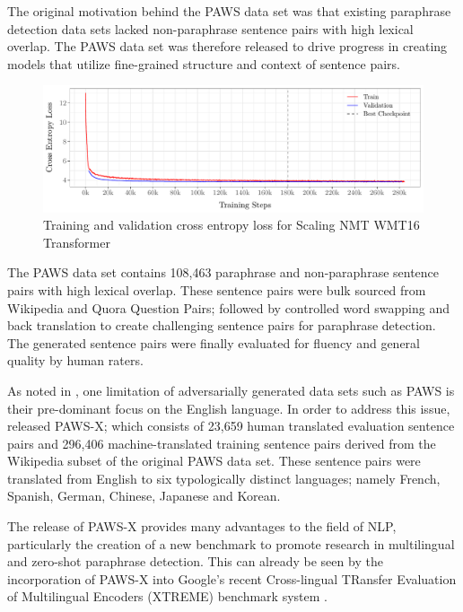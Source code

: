 \documentclass[11pt,a4paper]{article}
\begin{document}
The original motivation behind the PAWS data set was that existing paraphrase detection data sets lacked non-paraphrase sentence pairs with high lexical overlap. The PAWS data set was therefore released to drive progress in creating models that utilize fine-grained structure and context of sentence pairs.

\begin{figure}
  \centering 
  \includegraphics[trim={0cm 0cm 0cm 0cm},clip,width=\textwidth]{transformer_nmt_evolution.pdf}
  \caption{Training and validation cross entropy loss for Scaling NMT WMT16 Transformer}
  \label{transformer_nmt_evolution}
\end{figure}

The PAWS data set contains 108,463 paraphrase and non-paraphrase sentence pairs with high lexical overlap. These sentence pairs were bulk sourced from Wikipedia and Quora Question Pairs; followed by controlled word swapping and back translation to create challenging sentence pairs for paraphrase detection. The generated sentence pairs were finally evaluated for fluency and general quality by human raters.

As noted in \citet{pawsx2019emnlp}, one limitation of adversarially generated data sets such as PAWS is their pre-dominant focus on the English language. In order to address this issue, \citet{pawsx2019emnlp} released PAWS-X; which consists of 23,659 human translated evaluation sentence pairs and 296,406 machine-translated training sentence pairs derived from the Wikipedia subset of the original PAWS data set. These sentence pairs were translated from English to six typologically distinct languages; namely French, Spanish, German, Chinese, Japanese and Korean.

The release of PAWS-X provides many advantages to the field of NLP, particularly the creation of a new benchmark to promote research in multilingual and zero-shot paraphrase detection. This can already be seen by the incorporation of PAWS-X into Google's recent Cross-lingual TRansfer Evaluation of Multilingual Encoders (XTREME) benchmark system \cite{hu2020xtreme}.
\end{document}
